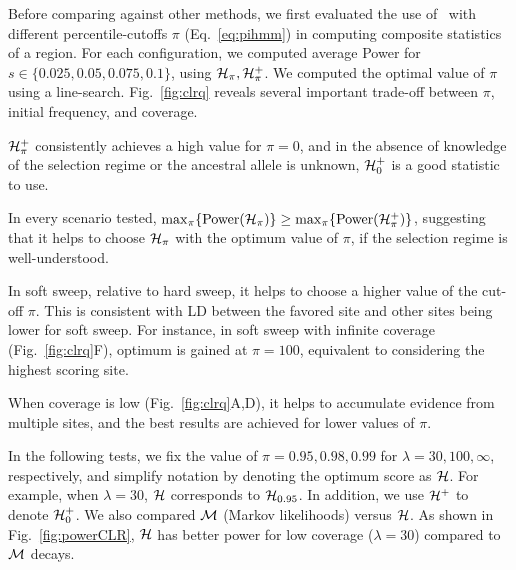 Before comparing against other methods, we first evaluated the use of
\comale\ with different percentile-cutoffs $\pi$ (Eq.~\ref{eq:pihmm})
in computing composite statistics of a region. For each configuration,
we computed average Power for $s\in\{0.025,0.05,0.075,0.1\}$, using
${\cal H}_\pi,{\cal H}^{+}_\pi$. We computed the optimal value of $\pi$ using a
line-search. Fig.~\ref{fig:clrq} reveals several important trade-off
between $\pi$, initial frequency, and coverage.
\begin{packed_itemize}
\item ${\cal H}^{+}_\pi$ consistently achieves a high value for $\pi=0$,
  and in the absence of knowledge of the selection regime or the
  ancestral allele is unknown, ${\cal H}^{+}_0$ is a good statistic to use.
\item In every scenario tested,
  $\max_{\pi}\{\mbox{Power}({\cal H}_\pi)\}\ge
  \max_{\pi}\{\mbox{Power}({\cal H}^{+}_\pi)\}$, suggesting that it helps
  to choose ${\cal H}_{\pi}$ with the optimum value of $\pi$, if the
  selection regime is well-understood.
\item In soft sweep, relative to hard sweep, it helps to choose a
  higher value of the cut-off $\pi$. This is consistent with LD
  between the favored site and other sites being lower for
  soft sweep. For instance, in soft sweep with infinite coverage
  (Fig.~\ref{fig:clrq}F), optimum is gained at $\pi=100$, equivalent
  to considering the highest scoring site.
\item When coverage is low (Fig.~\ref{fig:clrq}A,D), it helps to
  accumulate evidence from multiple sites, and the best results are
  achieved for lower values of $\pi$.
\end{packed_itemize}
In the following tests, we fix the value of $\pi=0.95,0.98, 0.99$ for
$\lambda=30,100,\infty$, respectively, and simplify notation by
denoting the optimum score as ${\cal H}$. For example, when $\lambda=30$,
${\cal H}$ corresponds to ${\cal H}_{0.95}$. In addition, we use ${\cal H}^{+}$ to
denote ${\cal H}^{+}_0$. We also compared ${\cal M}$ (Markov likelihoods) versus
${\cal H}$. As shown in Fig.~\ref{fig:powerCLR}, ${\cal H}$ has better power for
low coverage ($\lambda=30$) compared to ${\cal M}$ decays.




